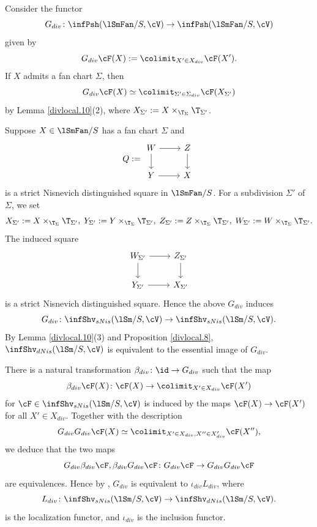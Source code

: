 \documentclass[10pt]{amsart}
\begin{document}
\begin{const}
\label{divlocal.7}
Consider the functor
\[
G_{div}\colon \infPsh(\lSmFan/S,\cV)
\to
\infPsh(\lSmFan/S,\cV)
\]
given by
\begin{equation}
\label{divlocal.7.1}
G_{div}\cF(X)
:=
\colimit_{X'\in X_{div}}\cF(X').
\end{equation}
If $X$ admits a fan chart $\Sigma$, then
\begin{equation}
G_{div}\cF(X)
\simeq
\colimit_{\Sigma'\in \Sigma_{div}}\cF(X_{\Sigma'})
\end{equation}
by Lemma \ref{divlocal.10}(2), where $X_{\Sigma'}:=X\times_{\T_\Sigma}\T_{\Sigma'}$.

Suppose $X\in \lSmFan/S$ has a fan chart $\Sigma$ and
\begin{equation}
\label{divlocal.7.2}
Q
:=
\begin{tikzcd}
W\ar[d]\ar[r]&
Z\ar[d]
\\
Y\ar[r]&
X
\end{tikzcd}
\end{equation}
is a strict Nisnevich distinguished square in $\lSmFan/S$.
For a subdivision $\Sigma'$ of $\Sigma$, we set
\[
X_{\Sigma'}:=X\times_{\T_{\Sigma}}\T_{\Sigma'},
\;
Y_{\Sigma'}:=Y\times_{\T_{\Sigma}}\T_{\Sigma'},
\;
Z_{\Sigma'}:=Z\times_{\T_{\Sigma}}\T_{\Sigma'},
\;
W_{\Sigma'}:=W\times_{\T_{\Sigma}}\T_{\Sigma'}.
\]
The induced square
\[
\begin{tikzcd}
W_{\Sigma'}\ar[d]\ar[r]&
Z_{\Sigma'}\ar[d]
\\
Y_{\Sigma'}\ar[r]&
X_{\Sigma'}
\end{tikzcd}
\]
is a strict Nisnevich distinguished square.
Hence the above $G_{div}$ induces 
\[
G_{div}
\colon
\infShv_{sNis}(\lSm/S,\cV)
\to
\infShv_{sNis}(\lSm/S,\cV).
\]
By Lemma \ref{divlocal.10}(3) and Proposition \ref{divlocal.8}, $\infShv_{dNis}(\lSm/S,\cV)$ is equivalent to the essential image of $G_{div}$.

There is a natural transformation $\beta_{div}\colon \id \to G_{div}$ such that the map
\[
\beta_{div}\cF(X) \colon \cF(X)\to \colimit_{X'\in X_{div}}\cF(X')
\]
for $\cF\in \infShv_{sNis}(\lSm/S,\cV)$ is induced by the maps $\cF(X)\to \cF(X')$ for all $X'\in X_{div}$.
Together with the description
\[
G_{div}G_{div}\cF(X)
\simeq
\colimit_{X'\in X_{div},X''\in X_{div}'}\cF(X''),
\]
we deduce that the two maps
\[
G_{div}\beta_{div}\cF,\beta_{div}G_{div}\cF
\colon
G_{div}\cF\to G_{div}G_{div}\cF
\]
are equivalences.
Hence by \cite[Proposition 5.2.7.4]{HTT}, $G_{div}$ is equivalent to $\iota_{div} L_{div}$, where  
\[
L_{div}
\colon
\infShv_{sNis}(\lSm/S,\cV)
\to
\infShv_{dNis}(\lSm/S,\cV).
\]
is the localization functor, and $\iota_{div}$ is the inclusion functor.
\end{const}
\end{document}
